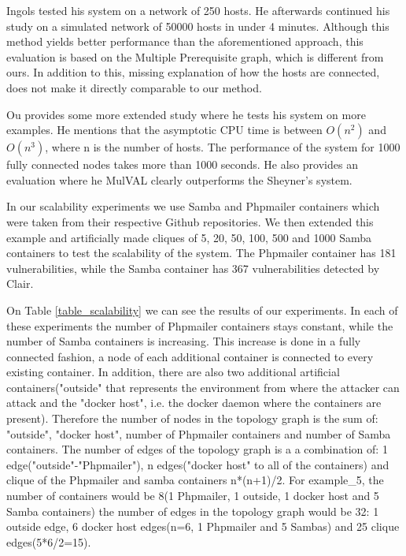 \documentclass[letterpaper, 10 pt, conference]{ieeeconf}  %
\begin{document}
Ingols tested his system on a network of 250 hosts. He afterwards continued his study on a simulated network of 50000 hosts in under 4 minutes.\cite{ingols} Although this method yields better performance than the aforementioned approach, this evaluation is based on the Multiple Prerequisite graph, which is different from ours. In addition to this, missing explanation of how the hosts are connected, does not make it directly comparable to our method.

Ou provides some more extended study where he tests his system on more examples.\cite{ou}  He mentions that the asymptotic CPU time is between $O(n^2)$ and $O(n^3)$, where n is the number of hosts. The performance of the system for 1000 fully connected nodes takes more than 1000 seconds. He also provides an evaluation where he MulVAL clearly outperforms the Sheyner's system.

In our scalability experiments we use Samba\cite{samba} and Phpmailer\cite{phpmailer} containers which were taken from their respective Github repositories. We then extended this example and artificially made cliques of 5, 20, 50, 100, 500 and 1000 Samba containers to test the scalability of the system. The Phpmailer container has 181 vulnerabilities, while the Samba container has 367 vulnerabilities detected by Clair.

On Table \ref{table_scalability} we can see the results of our experiments. In each of these experiments the number of Phpmailer containers stays constant, while the number of Samba containers is increasing. This increase is done in a fully connected fashion, a node of each additional container is connected to every existing container. In addition, there are also two additional artificial containers("outside" that represents the environment from where the attacker can attack and the "docker host", i.e. the docker daemon where the containers are present). Therefore the number of nodes in the topology graph is the sum of: "outside", "docker host", number of Phpmailer containers and number of Samba containers. The number of edges of the topology graph is a a combination of: 1 edge("outside"-"Phpmailer"), n edges("docker host" to all of the containers) and clique of the Phpmailer and samba containers n*(n+1)/2. For example\_5, the number of containers would be 8(1 Phpmailer, 1 outside, 1 docker host and 5 Samba containers) the number of edges in the topology graph would be 32: 1 outside edge, 6 docker host edges(n=6, 1 Phpmailer and 5 Sambas) and 25 clique edges(5*6/2=15).
\end{document}
